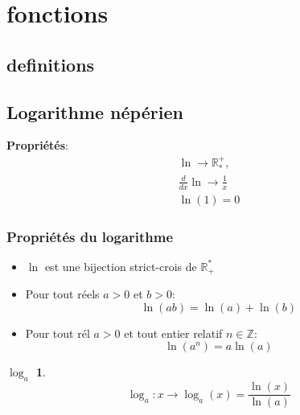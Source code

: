 \section{fonctions}
	\subsection{definitions}

	\subsection{Logarithme n\'ep\'erien}
	\textbf{Propri\'et\'es}: \\
	\begin{align*}
		\ln \rightarrow \mathbb{R}^+_*,\\
		\frac{d}{dx}\ln \rightarrow \frac{1}{x}\\
		\ln(1) = 0
	\end{align*}
	\subsubsection{Propri\'et\'es du logarithme}
		\begin{itemize}
			\item $\ln$ est une bijection strict-crois de $\mathbb{R}_+^*$
			\item Pour tout r\'eels $a>0$ et $b>0$:
			\begin{equation*}
   				\ln(ab) = \ln(a)+\ln(b)	
   			\end{equation*}
		\item Pour tout r\'el $a>0$ et tout entier relatif $n \in \mathbb{Z}$:
		\begin{equation*}
			\ln(a^n)=a\ln(a)
    		\end{equation*}
			
		\end{itemize}
	
	\newtheorem{definition}{$\log_a$}
	\begin{definition}
		\begin{equation}
			\log_a:x \rightarrow\log_a(x)=\frac{\ln(x)}{\ln(a)}
  		\end{equation}
	\end{definition}
